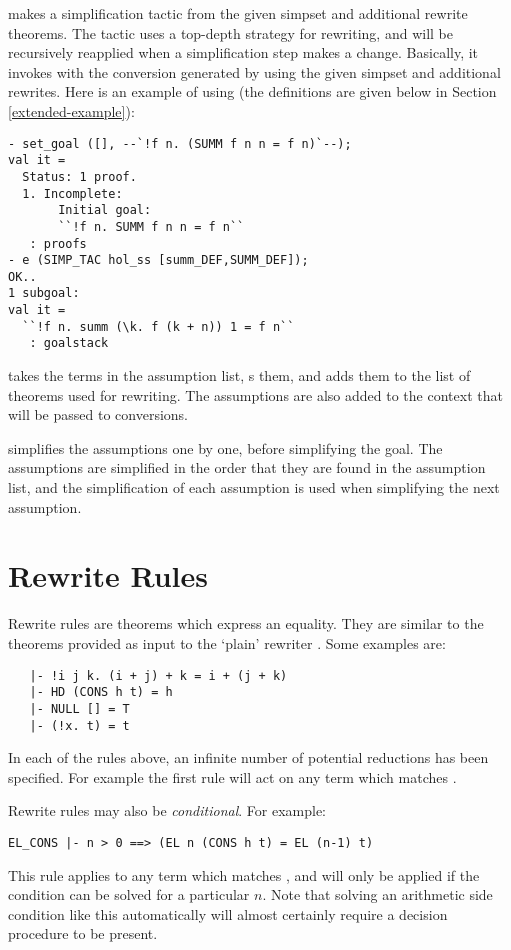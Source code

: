  makes a simplification tactic from the given simpset
and additional rewrite theorems. The tactic uses a top-depth strategy
for rewriting, and will be recursively reapplied when a simplification
step makes a change. Basically, it invokes  with the
conversion generated by  using the given simpset and
additional rewrites. Here is an example of using  (the
definitions are given below in Section \ref{extended-example}):
\begin{verbatim}
- set_goal ([], --`!f n. (SUMM f n n = f n)`--);
val it =
  Status: 1 proof.
  1. Incomplete:
       Initial goal:
       ``!f n. SUMM f n n = f n``
   : proofs
- e (SIMP_TAC hol_ss [summ_DEF,SUMM_DEF]);
OK..
1 subgoal:
val it =
  ``!f n. summ (\k. f (k + n)) 1 = f n``
   : goalstack
\end{verbatim}

 takes the terms in the assumption list,
s them, and adds them to the list of theorems used for
rewriting. The assumptions are also added to the context that will be
passed to conversions.

 simplifies the assumptions one by one, before
simplifying the goal.  The assumptions are simplified in the order
that they are found in the assumption list, and the simplification
of each assumption is used when simplifying the next assumption.

\section{Rewrite Rules}

\label{rewrite-rules}

Rewrite rules are theorems which express an equality.  They
are similar to the theorems
provided as input to the `plain' rewriter
.  Some examples are:
\begin{hol}\begin{verbatim}
   |- !i j k. (i + j) + k = i + (j + k)
   |- HD (CONS h t) = h
   |- NULL [] = T
   |- (!x. t) = t
\end{verbatim}\end{hol}
In each of the rules above, an infinite number of potential
reductions has been specified.  For example the first rule
will act on any term which matches .

Rewrite rules may also be {\em conditional}.  For example:
\begin{hol}\begin{verbatim}
EL_CONS |- n > 0 ==> (EL n (CONS h t) = EL (n-1) t)
\end{verbatim}\end{hol}
This
rule applies to any term which matches ,
and will only be applied if the condition  can be
solved for a particular $n$.  Note that solving an arithmetic side condition
like this automatically will almost certainly
require a decision procedure to be present.

